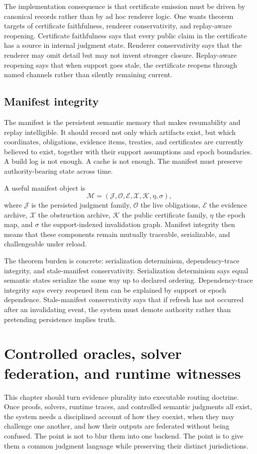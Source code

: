 \documentclass[11pt]{report}
\begin{document}
The implementation consequence is that certificate emission must be driven by canonical records rather than by ad hoc renderer logic. One wants theorem targets of certificate faithfulness, renderer conservativity, and replay-aware reopening. Certificate faithfulness says that every public claim in the certificate has a source in internal judgment state. Renderer conservativity says that the renderer may omit detail but may not invent stronger closure. Replay-aware reopening says that when support goes stale, the certificate reopens through named channels rather than silently remaining current.
\section{Manifest integrity}
The manifest is the persistent semantic memory that makes resumability and replay intelligible. It should record not only which artifacts exist, but which coordinates, obligations, evidence items, treaties, and certificates are currently believed to exist, together with their support assumptions and epoch boundaries. A build log is not enough. A cache is not enough. The manifest must preserve authority-bearing state across time.

A useful manifest object is
\[
\mathcal{M} = (\mathcal{J}, \mathcal{O}, \mathcal{E}, \mathcal{X}, \mathcal{K}, \eta, \sigma),
\]
where $\mathcal{J}$ is the persisted judgment family, $\mathcal{O}$ the live obligations, $\mathcal{E}$ the evidence archive, $\mathcal{X}$ the obstruction archive, $\mathcal{K}$ the public certificate family, $\eta$ the epoch map, and $\sigma$ the support-indexed invalidation graph. Manifest integrity then means that these components remain mutually traceable, serializable, and challengeable under reload.

The theorem burden is concrete: serialization determinism, dependency-trace integrity, and stale-manifest conservativity. Serialization determinism says equal semantic states serialize the same way up to declared ordering. Dependency-trace integrity says every reopened item can be explained by support or epoch dependence. Stale-manifest conservativity says that if refresh has not occurred after an invalidating event, the system must demote authority rather than pretending persistence implies truth.
\chapter{Controlled oracles, solver federation, and runtime witnesses}
This chapter should turn evidence plurality into executable routing doctrine. Once proofs, solvers, runtime traces, and controlled semantic judgments all exist, the system needs a disciplined account of how they coexist, when they may challenge one another, and how their outputs are federated without being confused. The point is not to blur them into one backend. The point is to give them a common judgment language while preserving their distinct jurisdictions.
\end{document}
